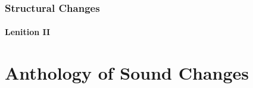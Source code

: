 \documentclass{report}[12pt]
\begin{document}
\subsection{Structural Changes}

\subsubsection{Lenition II}\label{sec:lenition_2}

\begin{tcolorbox}

\end{tcolorbox}

\chapter{Anthology of Sound Changes}




\end{document}
